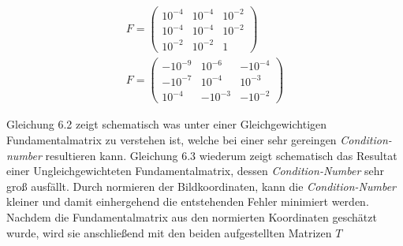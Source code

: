 \begin{gather}
	F = \begin{pmatrix}
		10^{-4}&10^{-4}&10^{-2}\\
	10^{-4}	&10^{-4}&10^{-2}\\
		10^{-2}&10^{-2}&1
	\end{pmatrix}\\
	F = \begin{pmatrix}
	-10^{-9}&10^{-6}&-10^{-4}\\
	-10^{-7}&10^{-4}&10^{-3}\\
	10^{-4}&-10^{-3}&-10^{-2}
\end{pmatrix}
\end{gather}

Gleichung 6.2 zeigt schematisch was unter einer Gleichgewichtigen Fundamentalmatrix zu verstehen ist, welche bei einer sehr gereingen \textit{Condition-number} resultieren kann. Gleichung 6.3 wiederum zeigt schematisch das Resultat einer Ungleichgewichteten Fundamentalmatrix, dessen \textit{Condition-Number} sehr groß ausfällt\cite{HZ8}. Durch normieren der Bildkoordinaten, kann die \textit{Condition-Number} kleiner und damit einhergehend die entstehenden Fehler minimiert werden. Nachdem die Fundamentalmatrix aus den normierten Koordinaten geschätzt wurde, wird sie anschließend mit den beiden aufgestellten Matrizen $T$
